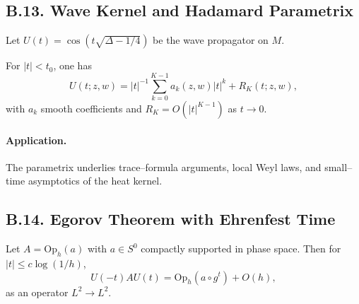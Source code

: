 %

%
%
\subsection*{B.13. Wave Kernel and Hadamard Parametrix}

Let $U(t)=\cos(t\sqrt{\Delta-1/4})$ be the wave propagator on $M$.

\begin{proposition}\label{prop:B13}
For $|t|<t_0$, one has
\begin{equation}
  U(t;z,w)=|t|^{-1}\sum_{k=0}^{K-1}a_k(z,w)|t|^k+R_K(t;z,w),
\end{equation}
with $a_k$ smooth coefficients and $R_K=O(|t|^{K-1})$ as $t\to0$.
\end{proposition}

\paragraph{Application.}
The parametrix underlies trace–formula arguments, local Weyl laws,
and small–time asymptotics of the heat kernel.

%

%
\subsection*{B.14. Egorov Theorem with Ehrenfest Time}

\begin{theorem}\label{thm:B14}
Let $A=\mathrm{Op}_h(a)$ with $a\in S^0$ compactly supported in phase space.
Then for $|t|\le c\log(1/h)$,
\[
  U(-t)AU(t)=\mathrm{Op}_h(a\circ g^t)+O(h),
\]
as an operator $L^2\to L^2$.
\end{theorem}

